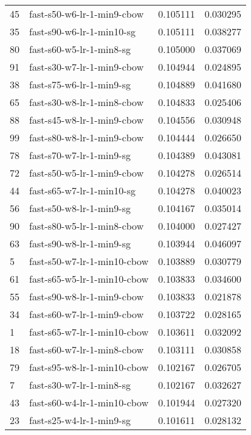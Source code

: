 {\begin{tabular}{llrr}
45 &   fast-s50-w6-lr-1-min9-cbow &  0.105111 &  0.030295 \\
35 &    fast-s90-w6-lr-1-min10-sg &  0.105111 &  0.038277 \\
80 &     fast-s60-w5-lr-1-min8-sg &  0.105000 &  0.037069 \\
91 &   fast-s30-w7-lr-1-min9-cbow &  0.104944 &  0.024895 \\
38 &     fast-s75-w6-lr-1-min9-sg &  0.104889 &  0.041680 \\
65 &   fast-s30-w8-lr-1-min8-cbow &  0.104833 &  0.025406 \\
88 &   fast-s45-w8-lr-1-min9-cbow &  0.104556 &  0.030948 \\
99 &   fast-s80-w8-lr-1-min9-cbow &  0.104444 &  0.026650 \\
78 &     fast-s70-w7-lr-1-min9-sg &  0.104389 &  0.043081 \\
72 &   fast-s50-w5-lr-1-min9-cbow &  0.104278 &  0.026514 \\
44 &    fast-s65-w7-lr-1-min10-sg &  0.104278 &  0.040023 \\
56 &     fast-s50-w8-lr-1-min9-sg &  0.104167 &  0.035014 \\
90 &   fast-s80-w5-lr-1-min8-cbow &  0.104000 &  0.027427 \\
63 &     fast-s90-w8-lr-1-min9-sg &  0.103944 &  0.046097 \\
5  &  fast-s50-w7-lr-1-min10-cbow &  0.103889 &  0.030779 \\
61 &  fast-s65-w5-lr-1-min10-cbow &  0.103833 &  0.034600 \\
55 &   fast-s90-w8-lr-1-min9-cbow &  0.103833 &  0.021878 \\
34 &   fast-s60-w7-lr-1-min9-cbow &  0.103722 &  0.028165 \\
1  &  fast-s65-w7-lr-1-min10-cbow &  0.103611 &  0.032092 \\
18 &   fast-s60-w7-lr-1-min8-cbow &  0.103111 &  0.030858 \\
79 &  fast-s95-w8-lr-1-min10-cbow &  0.102167 &  0.026705 \\
7  &     fast-s30-w7-lr-1-min8-sg &  0.102167 &  0.032627 \\
43 &  fast-s60-w4-lr-1-min10-cbow &  0.101944 &  0.027320 \\
23 &     fast-s25-w4-lr-1-min9-sg &  0.101611 &  0.028132 \\
\bottomrule
\end{tabular}
}

